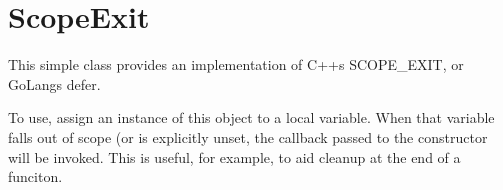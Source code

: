 \chapter{Scope\+Exit}
\hypertarget{md_public_2glpi_2vendor_2phplang_2scope-exit_2_r_e_a_d_m_e}{}\label{md_public_2glpi_2vendor_2phplang_2scope-exit_2_r_e_a_d_m_e}
\label{md_public_2glpi_2vendor_2phplang_2scope-exit_2_r_e_a_d_m_e_autotoc_md6892}%
%
 This simple class provides an implementation of C++\textquotesingle{}s {\ttfamily SCOPE\+\_\+\+EXIT}, or Go\+Lang\textquotesingle{}s {\ttfamily defer}.

To use, assign an instance of this object to a local variable. When that variable falls out of scope (or is explicitly {\ttfamily unset}, the callback passed to the constructor will be invoked. This is useful, for example, to aid cleanup at the end of a funciton.


\begin{DoxyCode}{0}
\DoxyCodeLine{\}}
\DoxyCodeLine{}

\end{DoxyCode}
 